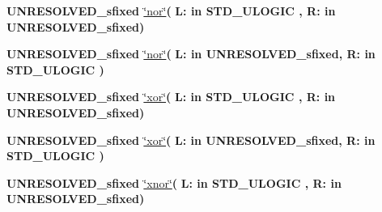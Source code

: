 \begin{DoxyCompactItemize}
\item 
{\bfseries {\bfseries \textcolor{vhdlchar}{U\+N\+R\+E\+S\+O\+L\+V\+E\+D\+\_\+sfixed}\textcolor{vhdlchar}{ }}} \hyperlink{class__fixed__pkg_aad7955f8191d6bf6980eef4991f65c8f}{\char`\"{}nor\char`\"{}}{\bfseries  ( }{\bfseries \textcolor{vhdlchar}{L\+: }\textcolor{stringliteral}{in }{\bfseries \textcolor{comment}{S\+T\+D\+\_\+\+U\+L\+O\+G\+I\+C}\textcolor{vhdlchar}{ }}}{\bfseries  , \textcolor{vhdlchar}{R\+: }\textcolor{stringliteral}{in }\textcolor{vhdlchar}{U\+N\+R\+E\+S\+O\+L\+V\+E\+D\+\_\+sfixed}}{\bfseries  )} 
\item 
{\bfseries {\bfseries \textcolor{vhdlchar}{U\+N\+R\+E\+S\+O\+L\+V\+E\+D\+\_\+sfixed}\textcolor{vhdlchar}{ }}} \hyperlink{class__fixed__pkg_aad7955f8191d6bf6980eef4991f65c8f}{\char`\"{}nor\char`\"{}}{\bfseries  ( }{\bfseries \textcolor{vhdlchar}{L\+: }\textcolor{stringliteral}{in }\textcolor{vhdlchar}{U\+N\+R\+E\+S\+O\+L\+V\+E\+D\+\_\+sfixed}}{\bfseries  , \textcolor{vhdlchar}{R\+: }\textcolor{stringliteral}{in }{\bfseries \textcolor{comment}{S\+T\+D\+\_\+\+U\+L\+O\+G\+I\+C}\textcolor{vhdlchar}{ }}}{\bfseries  )} 
\item 
{\bfseries {\bfseries \textcolor{vhdlchar}{U\+N\+R\+E\+S\+O\+L\+V\+E\+D\+\_\+sfixed}\textcolor{vhdlchar}{ }}} \hyperlink{class__fixed__pkg_ade30a4b44e5f614fbfb4d95f0eaa8e60}{\char`\"{}xor\char`\"{}}{\bfseries  ( }{\bfseries \textcolor{vhdlchar}{L\+: }\textcolor{stringliteral}{in }{\bfseries \textcolor{comment}{S\+T\+D\+\_\+\+U\+L\+O\+G\+I\+C}\textcolor{vhdlchar}{ }}}{\bfseries  , \textcolor{vhdlchar}{R\+: }\textcolor{stringliteral}{in }\textcolor{vhdlchar}{U\+N\+R\+E\+S\+O\+L\+V\+E\+D\+\_\+sfixed}}{\bfseries  )} 
\item 
{\bfseries {\bfseries \textcolor{vhdlchar}{U\+N\+R\+E\+S\+O\+L\+V\+E\+D\+\_\+sfixed}\textcolor{vhdlchar}{ }}} \hyperlink{class__fixed__pkg_ade30a4b44e5f614fbfb4d95f0eaa8e60}{\char`\"{}xor\char`\"{}}{\bfseries  ( }{\bfseries \textcolor{vhdlchar}{L\+: }\textcolor{stringliteral}{in }\textcolor{vhdlchar}{U\+N\+R\+E\+S\+O\+L\+V\+E\+D\+\_\+sfixed}}{\bfseries  , \textcolor{vhdlchar}{R\+: }\textcolor{stringliteral}{in }{\bfseries \textcolor{comment}{S\+T\+D\+\_\+\+U\+L\+O\+G\+I\+C}\textcolor{vhdlchar}{ }}}{\bfseries  )} 
\item 
{\bfseries {\bfseries \textcolor{vhdlchar}{U\+N\+R\+E\+S\+O\+L\+V\+E\+D\+\_\+sfixed}\textcolor{vhdlchar}{ }}} \hyperlink{class__fixed__pkg_ad2d3fa25b28fee177997bfb173f92fea}{\char`\"{}xnor\char`\"{}}{\bfseries  ( }{\bfseries \textcolor{vhdlchar}{L\+: }\textcolor{stringliteral}{in }{\bfseries \textcolor{comment}{S\+T\+D\+\_\+\+U\+L\+O\+G\+I\+C}\textcolor{vhdlchar}{ }}}{\bfseries  , \textcolor{vhdlchar}{R\+: }\textcolor{stringliteral}{in }\textcolor{vhdlchar}{U\+N\+R\+E\+S\+O\+L\+V\+E\+D\+\_\+sfixed}}{\bfseries  )} 

\end{DoxyCompactItemize}
